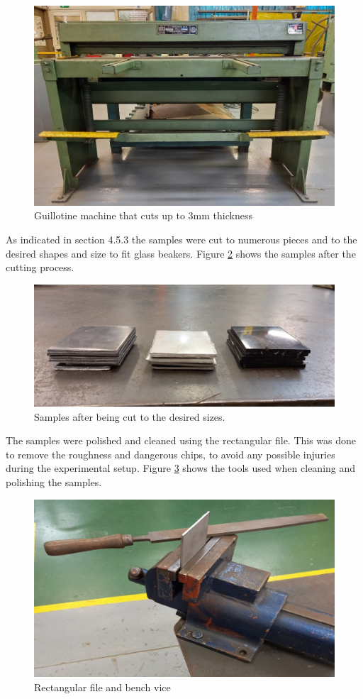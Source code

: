 \documentclass[12pt]{report}
\begin{document}
\begin{figure}[H]
    \centering
    \includegraphics[width=.55\textwidth]{3mm_guillotine_machine.jpg}
    \caption{Guillotine machine that cuts up to 3mm thickness}
    \label{ch4:figure:3mm_guillotine}
\end{figure}

As indicated in section 4.5.3 the samples were cut to numerous pieces and to the desired shapes and size to fit glass beakers. Figure \ref{ch4:figure:samples} shows the samples after the cutting process. 
 
\begin{figure}[H]
    \centering
    \includegraphics[width=.8\textwidth]{samples_after_being_cut.jpg}
    \caption{Samples after being cut to the desired sizes.}
    \label{ch4:figure:samples}
\end{figure}

The samples were polished and cleaned using the rectangular file. This was done to remove the roughness and dangerous chips, to avoid any possible injuries during the experimental setup. Figure \ref{ch4:figure:file_and_vice} shows the tools used when cleaning and polishing the samples.
 
\begin{figure}[H]
    \centering
    \includegraphics[width=.6\textwidth]{rectangular_file_and_bench_vice.jpg}
    \caption{Rectangular file and bench vice}
    \label{ch4:figure:file_and_vice}
\end{figure}
\end{document}
